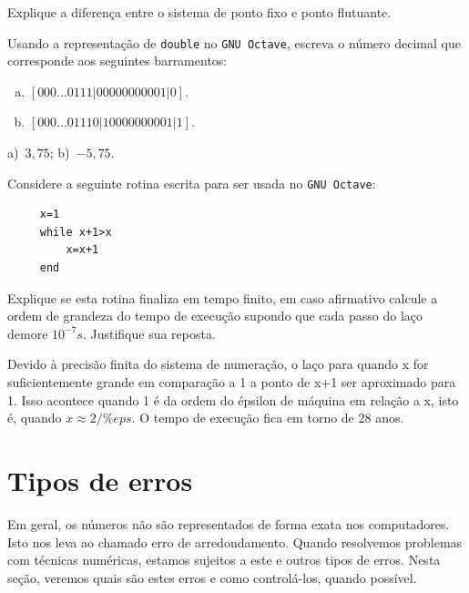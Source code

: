 \begin{exer}
  Explique a diferença entre o sistema de ponto fixo e ponto flutuante.
\end{exer}

\begin{exer}
  Usando a representação de \verb+double+ no \verb+GNU Octave+, escreva o número decimal que corresponde aos seguintes barramentos:
  \begin{enumerate}[a)]
  \item $[000\ldots 0111|00000000001|0]$.
  \item $[000\ldots 01110|10000000001|1]$.
  \end{enumerate}
\end{exer}
\begin{resp}
  a)~$3,75$; b)~$-5,75$.
\end{resp}

\begin{exer}Considere a seguinte rotina escrita para ser usada no \verb+GNU Octave+:
 \begin{verbatim}
     x=1
     while x+1>x
         x=x+1
     end
 \end{verbatim}
 Explique se esta rotina finaliza em tempo finito, em caso afirmativo calcule a ordem de grandeza do tempo de execução supondo que cada passo do laço demore $10^{-7}s$. Justifique sua reposta.
 \end{exer}
\begin{resp}
 Devido à precisão finita do sistema de numeração, o laço para quando x for suficientemente grande em comparação a 1 a ponto de x+1 ser aproximado para 1. Isso acontece quando 1 é da ordem do épsilon de máquina em relação a x, isto é, quando $x\approx 2/\%eps$. O tempo de execução fica em torno de 28 anos.
\end{resp}



\section{Tipos de erros}

Em geral, os números não são representados de forma exata nos computadores. Isto nos leva ao chamado erro de arredondamento. Quando resolvemos problemas com técnicas numéricas, estamos sujeitos a este e outros tipos de erros. Nesta seção, veremos quais são estes erros e como controlá-los, quando possível.

